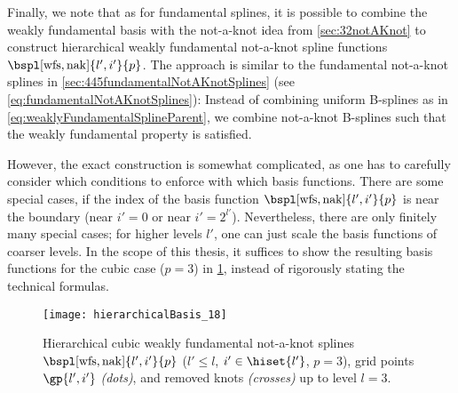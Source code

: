 Finally, we note that as for fundamental splines,
it is possible to combine the weakly fundamental basis
with the not-a-knot idea from \cref{sec:32notAKnot} to construct
hierarchical weakly fundamental not-a-knot spline functions
$\bspl[\wfs,\nak]{l',i'}{p}$.
The approach is similar to the fundamental not-a-knot splines
in \cref{sec:445fundamentalNotAKnotSplines}
(see \cref{eq:fundamentalNotAKnotSplines}):
Instead of combining uniform B-splines as in
\eqref{eq:weaklyFundamentalSplineParent},
we combine not-a-knot B-splines such that the
weakly fundamental property is satisfied.

However, the exact construction is somewhat complicated,
as one has to carefully consider which conditions to enforce
with which basis functions.
There are some special cases, if the index of the basis function
$\bspl[\wfs,\nak]{l',i'}{p}$ is near the boundary
(near $i' = 0$ or near $i' = 2^{l'}$).
Nevertheless, there are only finitely many special cases;
for higher levels $l'$, one can just scale the basis functions
of coarser levels.
In the scope of this thesis,
it suffices to show the resulting basis functions for
the cubic case ($p = 3$) in
\cref{fig:hierarchicalWeaklyFundamentalNotAKnotSpline},
instead of rigorously stating the technical formulas.

\begin{SCfigure}
  \texttt{[image: hierarchicalBasis\_18]}%
  \caption[%
    Hierarchical weakly fundamental not-a-knot splines%
  ]{%
    Hierarchical cubic weakly fundamental not-a-knot splines
    $\bspl[\wfs,\nak]{l',i'}{p}$
    ($l' \le l$, $i' \in \hiset{l'}$, $p = 3$),
    grid points $\gp{l',i'}$ \emph{(dots)}, and
    removed knots \emph{(crosses)} up to level $l = 3$.%
  }%
  \label{fig:hierarchicalWeaklyFundamentalNotAKnotSpline}%
\end{SCfigure}
